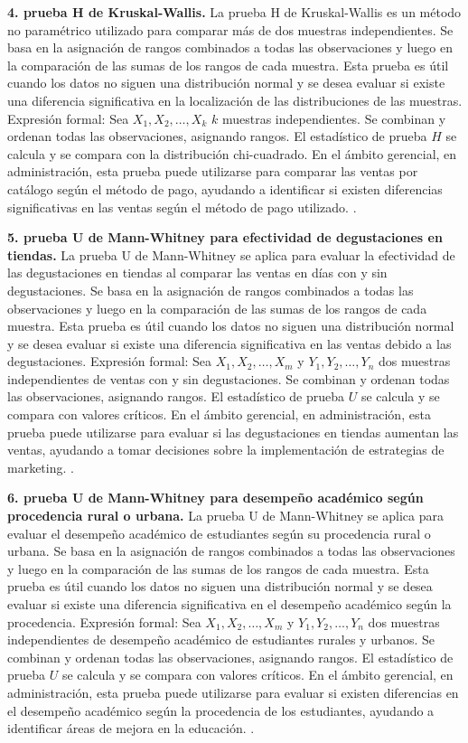 {\textbf{4. prueba H de Kruskal-Wallis.} La prueba H de Kruskal-Wallis es un método no paramétrico utilizado para comparar más de dos muestras independientes. Se basa en la asignación de rangos combinados a todas las observaciones y luego en la comparación de las sumas de los rangos de cada muestra. Esta prueba es útil cuando los datos no siguen una distribución normal y se desea evaluar si existe una diferencia significativa en la localización de las distribuciones de las muestras. Expresión formal: Sea $X_{1}, X_{2}, \ldots, X_{k}$ $k$ muestras independientes. Se combinan y ordenan todas las observaciones, asignando rangos. El estadístico de prueba $H$ se calcula y se compara con la distribución chi-cuadrado. En el ámbito gerencial, en administración, esta prueba puede utilizarse para comparar las ventas por catálogo según el método de pago, ayudando a identificar si existen diferencias significativas en las ventas según el método de pago utilizado. \citep{anderson2012,lind2012,wackerly2010}.

\textbf{5. prueba U de Mann-Whitney para efectividad de degustaciones en tiendas.} La prueba U de Mann-Whitney se aplica para evaluar la efectividad de las degustaciones en tiendas al comparar las ventas en días con y sin degustaciones. Se basa en la asignación de rangos combinados a todas las observaciones y luego en la comparación de las sumas de los rangos de cada muestra. Esta prueba es útil cuando los datos no siguen una distribución normal y se desea evaluar si existe una diferencia significativa en las ventas debido a las degustaciones. Expresión formal: Sea $X_1, X_2, \ldots, X_m$ y $Y_1, Y_2, \ldots, Y_n$ dos muestras independientes de ventas con y sin degustaciones. Se combinan y ordenan todas las observaciones, asignando rangos. El estadístico de prueba $U$ se calcula y se compara con valores críticos. En el ámbito gerencial, en administración, esta prueba puede utilizarse para evaluar si las degustaciones en tiendas aumentan las ventas, ayudando a tomar decisiones sobre la implementación de estrategias de marketing. \citep{anderson2012,lind2012,wackerly2010}.

\textbf{6. prueba U de Mann-Whitney para desempeño académico según procedencia rural o urbana.} La prueba U de Mann-Whitney se aplica para evaluar el desempeño académico de estudiantes según su procedencia rural o urbana. Se basa en la asignación de rangos combinados a todas las observaciones y luego en la comparación de las sumas de los rangos de cada muestra. Esta prueba es útil cuando los datos no siguen una distribución normal y se desea evaluar si existe una diferencia significativa en el desempeño académico según la procedencia. Expresión formal: Sea $X_1, X_2, \ldots, X_m$ y $Y_1, Y_2, \ldots, Y_n$ dos muestras independientes de desempeño académico de estudiantes rurales y urbanos. Se combinan y ordenan todas las observaciones, asignando rangos. El estadístico de prueba $U$ se calcula y se compara con valores críticos. En el ámbito gerencial, en administración, esta prueba puede utilizarse para evaluar si existen diferencias en el desempeño académico según la procedencia de los estudiantes, ayudando a identificar áreas de mejora en la educación. \citep{anderson2012,lind2012,wackerly2010}.

}

